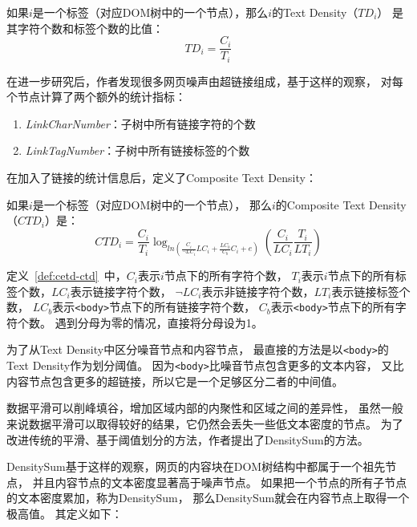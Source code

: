 \begin{definition}
\label{def:cetd-td}
如果$i$是一个标签（对应DOM树中的一个节点），那么$i$的Text Density（$TD_i$）
是其字符个数和标签个数的比值：
\begin{equation}
TD_i = \frac{C_i}{T_i}
\end{equation}
\end{definition}

在进一步研究后，作者发现很多网页噪声由超链接组成，基于这样的观察，
对每个节点计算了两个额外的统计指标：
\begin{enumerate}
\item \textit{LinkCharNumber}：子树中所有链接字符的个数
\item \textit{LinkTagNumber}：子树中所有链接标签的个数
\end{enumerate}

在加入了链接的统计信息后，定义了Composite Text Density：

\begin{definition}
\label{def:cetd-ctd}
如果$i$是一个标签（对应DOM树中的一个节点），
那么$i$的Composite Text Density（$CTD_i$）是：
\begin{equation}
CTD_i = \frac{C_i}{T_i}\log_{ln(\frac{C_i}{\neg LC_i}LC_i + 
\frac{LC_b}{C_b}C_i + e)}(\frac{C_i}{LC_i}\frac{T_i}{LT_i})
\end{equation}
\end{definition}

定义~\ref{def:cetd-ctd}~中，$C_i$表示$i$节点下的所有字符个数，
$T_i$表示$i$节点下的所有标签个数，$LC_i$表示链接字符个数，
$\neg LC_i$表示非链接字符个数，$LT_i$表示链接标签个数，
$LC_b$表示\texttt{<body>}节点下的所有链接字符个数，
$C_b$表示\texttt{<body>}节点下的所有字符个数。
遇到分母为零的情况，直接将分母设为1。

为了从Text Density中区分噪音节点和内容节点，
最直接的方法是以\texttt{<body>}的Text Density作为划分阈值。
因为\texttt{<body>}比噪音节点包含更多的文本内容，
又比内容节点包含更多的超链接，所以它是一个足够区分二者的中间值。

数据平滑可以削峰填谷，增加区域内部的内聚性和区域之间的差异性，
虽然一般来说数据平滑可以取得较好的结果，它仍然会丢失一些低文本密度的节点。
为了改进传统的平滑、基于阈值划分的方法，作者提出了DensitySum的方法。

DensitySum基于这样的观察，网页的内容块在DOM树结构中都属于一个祖先节点，
并且内容节点的文本密度显著高于噪声节点。
如果把一个节点的所有子节点的文本密度累加，称为DensitySum，
那么DensitySum就会在内容节点上取得一个极高值。
其定义如下：

